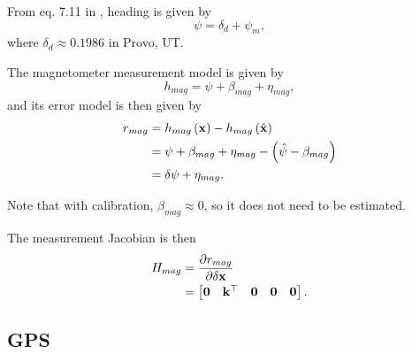 \documentclass[english]{article}
\begin{document}
From eq. 7.11 in \cite{key-3}, heading is given by
\begin{equation}
\psi = \delta_d + \psi_m,
\end{equation}
where $\delta_d\approx0.1986$ in Provo, UT. 

The magnetometer measurement model is given by
\begin{equation}
h_{mag} = \psi + \beta_{mag} + \eta_{mag},
\end{equation}
and its error model is then given by
\begin{align}
r_{mag} & = h_{mag}\left({\bf x}\right) - h_{mag}\left(\hat{{\bf x}}\right) \\
& = \psi + \beta_{mag} + \eta_{mag} - \left( \hat{\psi} - \beta_{mag}\right) \\
& = \delta \psi + \eta_{mag}.
\end{align}

Note that with calibration, $\beta_{mag}\approx0$, so it does not need to be estimated.

The measurement Jacobian is then
\begin{align}
H_{mag} & = \frac{\partial r_{mag}}{\partial \delta {\bf x}} \\
& = \begin{bmatrix} {\bf 0} & {\bf k}^\top & {\bf 0} & {\bf 0} & {\bf 0} \end{bmatrix}.
\end{align}

\subsection{GPS}
\end{document}
